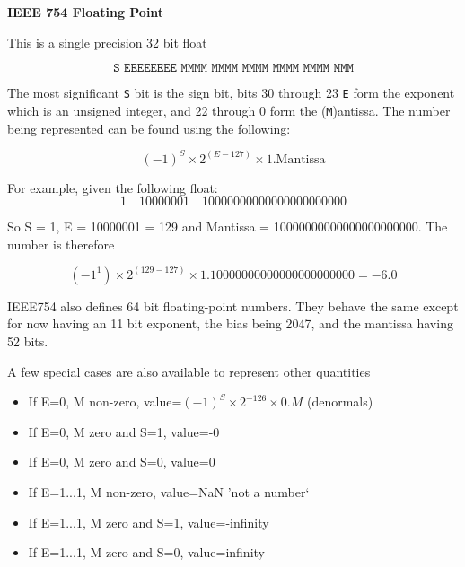 \documentclass[../notes.tex]{subfiles}
\begin{document}
\begin{definition}
	\textbf{IEEE 754 Floating Point}

	This is a single precision 32 bit float

	\begin{equation}
		\texttt{S  EEEEEEEE  MMMM MMMM MMMM MMMM MMMM MMM}
	\end{equation}
	

	The most significant \texttt{S} bit is the sign bit, bits 30 through 23 \texttt{E} form the exponent which is an unsigned integer, and 22 through 0 form the (\texttt{M})antissa. The number being represented can be found using the following:

	\begin{equation}
	(-1)^S \times 2 ^ {(E-127)} \times 1.\text{Mantissa}
		\label{eq:352:float32_eq}
	\end{equation}

	\begin{example}
		For example, given the following float:
		\begin{equation*}
			1\quad10000001\quad10000000000000000000000
		\end{equation*}
		
		So S = 1, E = 10000001 = 129 and Mantissa = 10000000000000000000000.
		The number is therefore

		\begin{equation}
			(-1^1) \times 2^{(129-127)} \times 1.10000000000000000000000 = -6.0
		\end{equation}
	\end{example}


	IEEE754 also defines 64 bit floating-point numbers. They behave the same except for now having an 11 bit exponent, the bias being 2047, and the mantissa having 52 bits.


	A few special cases are also available to represent other quantities

	\begin{itemize}
	\item If E=0, M non-zero, value=$(-1)^S \times 2^{-126} \times 0.M$ (denormals)
		\item If E=0, M zero and S=1, value=-0
		\item If E=0, M zero and S=0, value=0
		\item If E=1...1, M non-zero, value=NaN 'not a number`
		\item If E=1...1, M zero and S=1, value=-infinity
		\item If E=1...1, M zero and S=0, value=infinity
	\end{itemize}


\end{definition}
\end{document}
